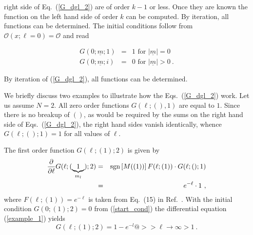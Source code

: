 right side of Eq.~(\ref{G_dgl_2}) are of order  $k-1$ or less. Once they
are known the function on the left hand side of order $k$ can be computed.
By iteration, all functions can be determined.
The initial conditions follow from 
${\mathcal O}(x;\ell=0)={\mathcal O}$ and read 
\begin{mathletters}
\label{start_cond}
\begin{eqnarray}
  G(0;{\underline m};1)&= & 1\mbox{ for }|{\underline
    m}|= 0\\
  G(0;{\underline m};i)&= & 0\mbox{ for }|{\underline
    m}|> 0\ .
\end{eqnarray}
\end{mathletters}
By iteration of (\ref{G_dgl_2}), all functions can be determined.

We briefly discuss two examples to illustrate how the 
 Eqs.~(\ref{G_dgl_2}) work. Let us assume $N=2$.
 All zero order functions $G(\ell;(),1)$ are
equal to $1$. Since there is no breakup of $()$, as would be
required by the sums
on the right hand side of Eqs.~(\ref{G_dgl_2}), the right hand sides
vanish identically, whence $G(\ell;();1)=1$ for all values of $\ell$. 

The first order function $G(\ell;(1);2)$ is given by 
\begin{eqnarray}\nonumber
  \frac{\partial}{\partial
  \ell} G(\ell;(\underbrace{1}_{m_l});2)
        &=&{\rm sgn}\left[M((1))\right]F(\ell;(1))\cdot G(\ell;();1)\\ 
  &=& e^{-\ell}\cdot 1\ ,\label{example_1}
\end{eqnarray}
where $F(\ell;(1))=e^{-\ell}$ is taken from
Eq.~(15) in Ref.~. With the initial condition
$G(0;(1);2)=0$  from (\ref{start_cond}) the differential
equation (\ref{example_1}) yields
\begin{equation}
  \label{ex_1_res}
  G(\ell;(1);2)=1-e^{-l}@>>{\ell\rightarrow\infty}>1\ .
\end{equation}


